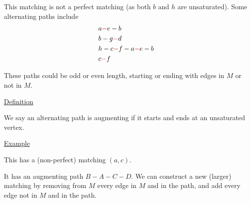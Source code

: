 \documentclass{article}
\begin{document}
This matching is not a perfect matching (as both $b$ and $h$ are unsaturated). Some alternating paths include
\begin{align*}
    &a \textcolor{red}{-} e -b \\
    &b - g \textcolor{red}{-} d \\
    &h - c \textcolor{red}{-} f - a \textcolor{red}{-} e - b\\
    &c \textcolor{red}{-} f
\end{align*}

These paths could be odd or even length, starting or ending with edges in $M$ or not in $M$. 

\underline{Definition}

We say an alternating path is augmenting if it starts and ends at an unsaturated vertex. 

\underline{Example}

\begin{center}
\end{center}

This has a (non-perfect) matching $(a,c)$. 

It has an augmenting path $B-A-C-D$. We can construct a new (larger) matching by removing from $M$ every edge in $M$ and in the path, and add every edge not in $M$ and in the path. 

\begin{center}
\end{center}
\end{document}
